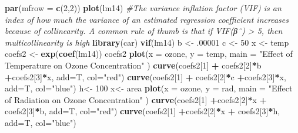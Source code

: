 \documentclass[]{article}
\newenvironment{Shaded}{\begin{snugshade}}{\end{snugshade}}
\newcommand{\KeywordTok}[1]{\textcolor[rgb]{0.13,0.29,0.53}{\textbf{#1}}}
\newcommand{\DataTypeTok}[1]{\textcolor[rgb]{0.13,0.29,0.53}{#1}}
\newcommand{\DecValTok}[1]{\textcolor[rgb]{0.00,0.00,0.81}{#1}}
\newcommand{\StringTok}[1]{\textcolor[rgb]{0.31,0.60,0.02}{#1}}
\newcommand{\CommentTok}[1]{\textcolor[rgb]{0.56,0.35,0.01}{\textit{#1}}}
\newcommand{\OperatorTok}[1]{\textcolor[rgb]{0.81,0.36,0.00}{\textbf{#1}}}
\newcommand{\NormalTok}[1]{#1}
\begin{document}
\begin{Shaded}
\begin{Highlighting}[]
  \KeywordTok{par}\NormalTok{(}\DataTypeTok{mfrow =} \KeywordTok{c}\NormalTok{(}\DecValTok{2}\NormalTok{,}\DecValTok{2}\NormalTok{)) }
  \KeywordTok{plot}\NormalTok{(lm14)}
 \CommentTok{#The variance inflation factor (VIF) is an index of how much the variance of an estimated regression coefficient increases because of collinearity. A common rule of thumb is that if VIF(βˆ) > 5, then multicollinearity is high}
\KeywordTok{library}\NormalTok{(car)}
\KeywordTok{vif}\NormalTok{(lm14)}
\NormalTok{b <-}\StringTok{ }\NormalTok{.}\DecValTok{00001}
\NormalTok{c <-}\StringTok{ }\DecValTok{50}
\NormalTok{x <-}\StringTok{ }\NormalTok{temp}
\NormalTok{coefs2 <-}\StringTok{ }\KeywordTok{exp}\NormalTok{(}\KeywordTok{coef}\NormalTok{(lm14))}
\NormalTok{coefs2}
\KeywordTok{plot}\NormalTok{(}\DataTypeTok{x =}\NormalTok{ ozone, }\DataTypeTok{y =}\NormalTok{ temp, }\DataTypeTok{main =} \StringTok{"Effect of Temperature on Ozone Concentration"}\NormalTok{ )}
\KeywordTok{curve}\NormalTok{(coefs2[}\DecValTok{1}\NormalTok{] }\OperatorTok{+}\StringTok{ }\NormalTok{coefs2[}\DecValTok{2}\NormalTok{]}\OperatorTok{*}\NormalTok{b }\OperatorTok{+}\NormalTok{coefs2[}\DecValTok{3}\NormalTok{]}\OperatorTok{*}\NormalTok{x, }\DataTypeTok{add=}\NormalTok{T, }\DataTypeTok{col=}\StringTok{"red"}\NormalTok{)}
\KeywordTok{curve}\NormalTok{(coefs2[}\DecValTok{1}\NormalTok{] }\OperatorTok{+}\StringTok{ }\NormalTok{coefs2[}\DecValTok{2}\NormalTok{]}\OperatorTok{*}\NormalTok{c }\OperatorTok{+}\NormalTok{coefs2[}\DecValTok{3}\NormalTok{]}\OperatorTok{*}\NormalTok{x, }\DataTypeTok{add=}\NormalTok{T, }\DataTypeTok{col=}\StringTok{"blue"}\NormalTok{)}
\NormalTok{h<-}\StringTok{ }\DecValTok{100}
\NormalTok{x<-}\StringTok{ }\NormalTok{area}
\KeywordTok{plot}\NormalTok{(}\DataTypeTok{x =}\NormalTok{ ozone, }\DataTypeTok{y =}\NormalTok{ rad, }\DataTypeTok{main =} \StringTok{"Effect of Radiation on Ozone Concentration"}\NormalTok{ )}
\KeywordTok{curve}\NormalTok{(coefs2[}\DecValTok{1}\NormalTok{] }\OperatorTok{+}\NormalTok{coefs2[}\DecValTok{2}\NormalTok{]}\OperatorTok{*}\NormalTok{x }\OperatorTok{+}\StringTok{ }\NormalTok{coefs2[}\DecValTok{3}\NormalTok{]}\OperatorTok{*}\NormalTok{b, }\DataTypeTok{add=}\NormalTok{T, }\DataTypeTok{col=}\StringTok{"red"}\NormalTok{)}
\KeywordTok{curve}\NormalTok{(coefs2[}\DecValTok{1}\NormalTok{] }\OperatorTok{+}\NormalTok{coefs2[}\DecValTok{2}\NormalTok{]}\OperatorTok{*}\NormalTok{x }\OperatorTok{+}\StringTok{ }\NormalTok{coefs2[}\DecValTok{3}\NormalTok{]}\OperatorTok{*}\NormalTok{h, }\DataTypeTok{add=}\NormalTok{T, }\DataTypeTok{col=}\StringTok{"blue"}\NormalTok{)}
\end{Highlighting}
\end{Shaded}
\end{document}
